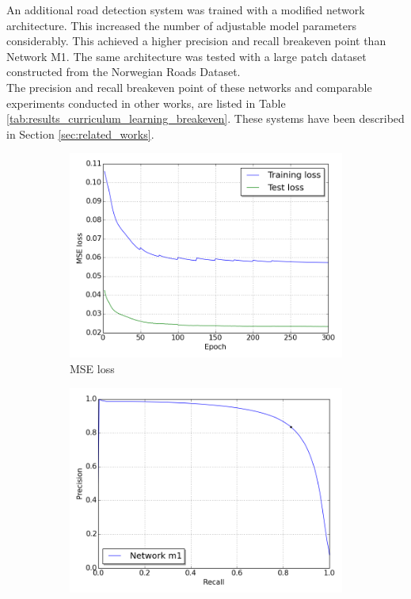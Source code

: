 An additional road detection system was trained with a modified network architecture. This increased the number of adjustable model parameters considerably. This achieved a higher precision and recall breakeven point than Network M1. The same architecture was tested with a large patch dataset constructed from the Norwegian Roads Dataset.\\

The precision and recall breakeven point of these networks and comparable experiments conducted in other works, are listed in Table \ref{tab:results_curriculum_learning_breakeven}. These systems have been described in Section \ref{sec:related_works}.\\

 
\begin{figure}
\begin{subfigure}{0.5\textwidth}
\includegraphics[width=\linewidth]{figs/E7/E7_lc_loss.png}
\caption{MSE loss} \label{fig:E7_performance_mass_lc}
\end{subfigure}
\hspace*{\fill} %
\begin{subfigure}{0.5\textwidth}
\includegraphics[width=\linewidth]{figs/E7/E7_pr.png}

\end{subfigure}
\end{figure}
